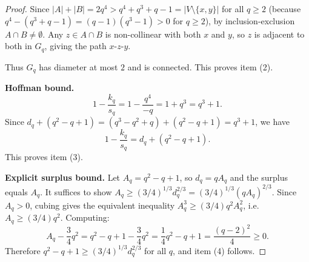 \begin{proof}
Since $|A|+|B|=2q^4>q^4+q^3+q-1=|V\setminus\{x,y\}|$ for all $q\ge 2$ (because $q^4-(q^3+q-1)=(q-1)(q^3-1)>0$ for $q\ge 2$), by inclusion-exclusion $A\cap B\ne\emptyset$. Any $z\in A\cap B$ is non-collinear with both $x$ and $y$, so $z$ is adjacent to both in $G_q$, giving the path $x$-$z$-$y$.

Thus $G_q$ has diameter at most $2$ and is connected. This proves item (2).

\textbf{Hoffman bound.}
\[
1-\frac{k_q}{s_q}=1-\frac{q^4}{-q}=1+q^3=q^3+1.
\]
Since $d_q+(q^2-q+1)=(q^3-q^2+q)+(q^2-q+1)=q^3+1$, we have
\[
1-\frac{k_q}{s_q}=d_q+(q^2-q+1).
\]
This proves item (3).

\textbf{Explicit surplus bound.} Let $A_q=q^2-q+1$, so $d_q=qA_q$ and the surplus equals $A_q$. It suffices to show $A_q\ge(3/4)^{1/3}d_q^{2/3}=(3/4)^{1/3}(qA_q)^{2/3}$. Since $A_q>0$, cubing gives the equivalent inequality $A_q^3\ge(3/4)q^2 A_q^2$, i.e.\ $A_q\ge(3/4)q^2$. Computing:
\[
A_q-\frac{3}{4}q^2=q^2-q+1-\frac{3}{4}q^2=\frac{1}{4}q^2-q+1=\frac{(q-2)^2}{4}\ge 0.
\]
Therefore $q^2-q+1\ge(3/4)^{1/3}d_q^{2/3}$ for all $q$, and item (4) follows.
\end{proof}
